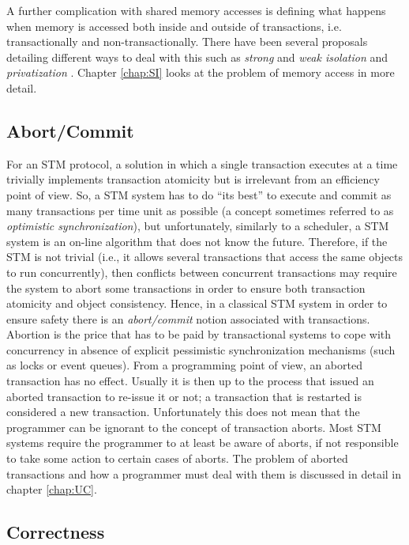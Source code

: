 A further complication with shared memory accesses is defining what happens when memory is accessed both inside and outside
of transactions, i.e. transactionally and non-transactionally.
There have been several proposals detailing different ways to deal with this such as \emph{strong} and \emph{weak isolation} \cite{shpeis07}
and \emph{privatization} \cite{spear:privitization:podc:2007}.
Chapter \ref{chap:SI} looks at the problem of memory access in more detail.

\subsection{Abort/Commit}
For an STM protocol, a solution in which a single transaction  executes at a time
trivially implements transaction atomicity but is irrelevant from 
an efficiency point of view. So, a STM system has to do ``its best'' to 
execute and commit as many transactions  per time unit as possible
(a concept sometimes referred to as \emph{optimistic synchronization}), 
but unfortunately, similarly to 
a scheduler, a STM system is an on-line algorithm that does not know 
the future. Therefore, if the STM is not trivial (i.e., it allows several transactions 
that access the same objects to run concurrently),  
then conflicts between concurrent transactions may require the system to abort some transactions in order 
to ensure both transaction  atomicity and object consistency.
Hence,  in  a
classical  STM system  in order to ensure safety  there    is  an    {\it   abort/commit}    notion
associated   with transactions. 
Abortion is   the price that has to  be paid by transactional  systems to cope 
with concurrency in  absence of explicit pessimistic synchronization mechanisms
(such as locks or event queues).
From a programming point of view, an aborted transaction has no effect.
Usually it is then up to the process that issued an aborted transaction to re-issue it or not; 
a transaction that is restarted is considered  a new transaction. 
Unfortunately this does not mean that the programmer can be ignorant to the concept of transaction aborts.
Most STM systems require the programmer to at least be aware of aborts, if not responsible to take
some action to certain cases of aborts.
The problem of aborted transactions and how a programmer must deal with them is discussed in detail in chapter
\ref{chap:UC}.



\subsection{Correctness}

